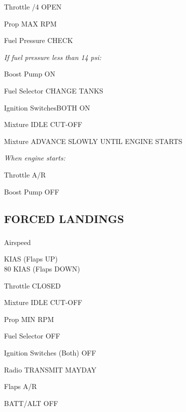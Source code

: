 \begin{multicols}{2}
\begin{enumerate*}
  \item Throttle /4 OPEN
  \item Prop \dotfill MAX RPM
  \item Fuel Pressure \dotfill CHECK
  \item \emph{If fuel pressure less than 14 psi:}
  \begin{itemize*}
    \item Boost Pump \dotfill ON
    \item Fuel Selector \dotfill CHANGE TANKS
    \end{itemize*}
  \item Ignition Switches\dotfill BOTH ON
  \item Mixture \dotfill IDLE CUT-OFF
  \item Mixture \dotfill ADVANCE SLOWLY UNTIL ENGINE STARTS
  \item \emph{When engine starts:}
  \begin{itemize*}
    \item Throttle \dotfill A/R
    \item Boost Pump \dotfill OFF
    \end{itemize*}
  
  \end{enumerate*}

\subsection*{FORCED LANDINGS}
\subsubsection*{}

\begin{enumerate*}
\item Airspeed \raggedright {} KIAS (Flaps UP)\\\hfill80 KIAS (Flaps DOWN)
\item Throttle \dotfill CLOSED
\item Mixture \dotfill IDLE CUT-OFF
\item Prop \dotfill MIN RPM
\item Fuel Selector \dotfill OFF
\item Ignition Switches (Both) \dotfill OFF
\item Radio \dotfill TRANSMIT MAYDAY
\item Flaps \dotfill A/R
\item BATT/ALT \dotfill OFF
\end{enumerate*}


\end{multicols}
